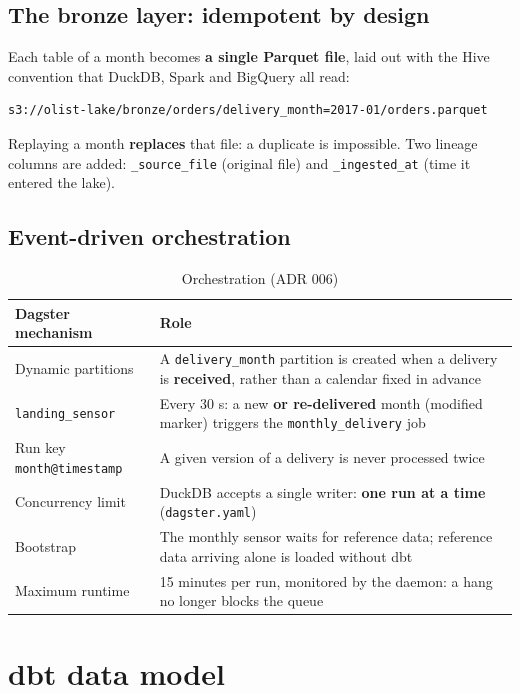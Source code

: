 \documentclass[11pt, a4paper, oneside, headings=normal, numbers=noenddot, DIV=12]{scrartcl}
\begin{document}
\subsection{The bronze layer: idempotent by design}
Each table of a month becomes \textbf{a single Parquet file}, laid out with the Hive convention that DuckDB, Spark and BigQuery all read:

\begin{lstlisting}[language={}]
s3://olist-lake/bronze/orders/delivery_month=2017-01/orders.parquet
\end{lstlisting}

Replaying a month \textbf{replaces} that file: a duplicate is impossible. Two lineage columns are added: \texttt{\_source\_file} (original
file) and \texttt{\_ingested\_at} (time it entered the lake).

\subsection{Event-driven orchestration}
\begin{table}[H]
\centering\small
\begin{tabularx}{\linewidth}{@{}L{3.6cm} Y@{}}
\toprule
\textbf{Dagster mechanism} & \textbf{Role} \\
\midrule
Dynamic partitions & A \texttt{delivery\_month} partition is created when a delivery is \textbf{received}, rather than a calendar fixed in advance \\
\texttt{landing\_sensor} & Every 30 s: a new \textbf{or re-delivered} month (modified marker) triggers the \texttt{monthly\_delivery} job \\
Run key \texttt{month@timestamp} & A given version of a delivery is never processed twice \\
Concurrency limit & DuckDB accepts a single writer: \textbf{one run at a time} (\texttt{dagster.yaml}) \\
Bootstrap & The monthly sensor waits for reference data; reference data arriving alone is loaded without dbt \\
Maximum runtime & 15 minutes per run, monitored by the daemon: a hang no longer blocks the queue \\
\bottomrule
\end{tabularx}
\caption{Orchestration (ADR 006)}
\end{table}

\section{dbt data model}
\end{document}
